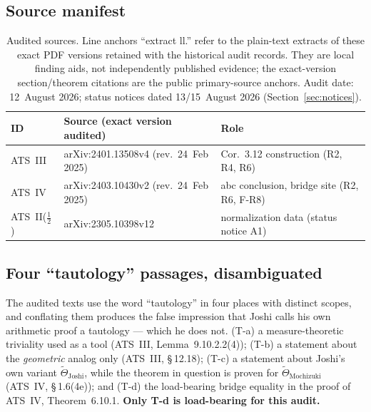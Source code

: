 \documentclass[11pt,a4paper]{article}
\begin{document}
\subsection{Source manifest}\label{sec:manifest}

\begin{table}[htbp]
\centering\small
\begin{tabularx}{\textwidth}{@{}l >{\raggedright\arraybackslash}X l@{}}
\toprule
ID & Source (exact version audited) & Role \\
\midrule
ATS~III & arXiv:2401.13508v4 (rev.\ 24~Feb 2025)~\cite{joshiIII} & Cor.~3.12 construction (R2, R4, R6) \\
ATS~IV & arXiv:2403.10430v2 (rev.\ 24~Feb 2025)~\cite{joshiIV} & abc conclusion, bridge site (R2, R6, F-R8) \\
ATS~II($\tfrac12$) & arXiv:2305.10398v12~\cite{joshiIIhalf} & normalization data (status notice A1) \\
\bottomrule
\end{tabularx}
\caption{Audited sources. Line anchors ``extract ll.'' refer to the plain-text
extracts of these exact PDF versions retained with the historical
audit records. They are local finding aids, not independently published
evidence; the exact-version section/theorem citations are the
public primary-source anchors. Audit date: 12~August
2026; status notices dated 13/15~August 2026 (Section~\ref{sec:notices}).}
\label{tab:manifest}
\end{table}

\subsection{\texorpdfstring{Four ``tautology'' passages, disambiguated}{Four "tautology" passages, disambiguated}}\label{sec:tautology}

The audited texts use the word ``tautology'' in four places with distinct
scopes, and conflating them produces the false impression that Joshi calls his
own arithmetic proof a tautology --- which he does not. (T-a) a
measure-theoretic triviality used as a tool (ATS~III, Lemma~9.10.2.2(4));
(T-b) a statement about the \emph{geometric} analog only (ATS~III, \S\,12.18);
(T-c) a statement about Joshi's own variant $\tilde\Theta_{\mathrm{Joshi}}$,
while the theorem in question is proven for
$\tilde\Theta_{\mathrm{Mochizuki}}$ (ATS~IV, \S\,1.6(4e)); and (T-d) the
load-bearing bridge equality in the proof of ATS~IV, Theorem~6.10.1.
\textbf{Only T-d is load-bearing for this audit.}
\end{document}
